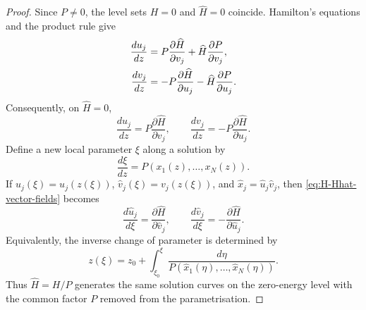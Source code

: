 \documentclass[11pt,a4paper]{article}
\numberwithin{equation}{section}
\begin{document}
\begin{proof}
Since $P\ne0$, the level sets $H=0$ and $\widehat{H}=0$ coincide. Hamilton's equations and the product rule give
\begin{align}
    \frac{du_j}{dz}
    &=P\frac{\partial\widehat{H}}{\partial v_j}
    +\widehat{H}\frac{\partial P}{\partial v_j},
    \notag\\
    \frac{dv_j}{dz}
    &=-P\frac{\partial\widehat{H}}{\partial u_j}
    -\widehat{H}\frac{\partial P}{\partial u_j}.
\end{align}
Consequently, on $\widehat{H}=0$,
\begin{equation}
    \frac{du_j}{dz}
    =P\frac{\partial\widehat{H}}{\partial v_j},
    \qquad
    \frac{dv_j}{dz}
    =-P\frac{\partial\widehat{H}}{\partial u_j}.
    \label{eq:H-Hhat-vector-fields}
\end{equation}
Define a new local parameter $\xi$ along a solution by
\begin{equation}
    \frac{d\xi}{dz}
    =P(x_1(z),\dots,x_N(z)).
    \label{eq:xi-z-P-reparam}
\end{equation}
If $\widehat{u}_j(\xi)=u_j(z(\xi))$, $\widehat{v}_j(\xi)=v_j(z(\xi))$, and $\widehat{x}_j=\widehat{u}_j\widehat{v}_j$, then \eqref{eq:H-Hhat-vector-fields} becomes
\begin{equation}
    \frac{d\widehat{u}_j}{d\xi}
    =\frac{\partial\widehat{H}}{\partial\widehat{v}_j},
    \qquad
    \frac{d\widehat{v}_j}{d\xi}
    =-\frac{\partial\widehat{H}}{\partial\widehat{u}_j}.
\end{equation}
Equivalently, the inverse change of parameter is determined by
\begin{equation}
    z(\xi)
    =z_0+
    \int_{\xi_0}^{\xi}
    \frac{d\eta}
    {P(\widehat{x}_1(\eta),\dots,\widehat{x}_N(\eta))}.
    \label{eq:z-xi-P-reparam}
\end{equation}
Thus $\widehat{H}=H/P$ generates the same solution curves on the zero-energy level with the common factor $P$ removed from the parametrisation.
\end{proof}
\end{document}
